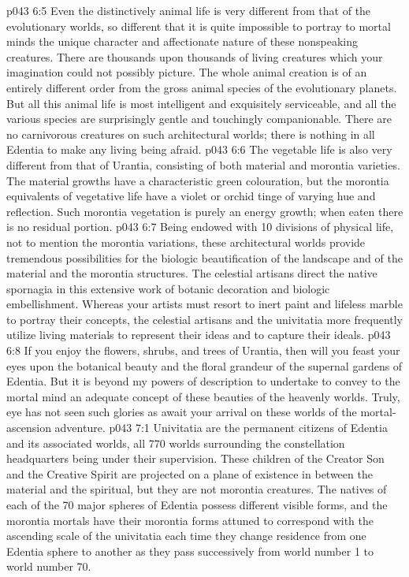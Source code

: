 \vs p043 6:5 Even the distinctively animal life is very different from that of the evolutionary worlds, so different that it is quite impossible to portray to mortal minds the unique character and affectionate nature of these nonspeaking creatures. There are thousands upon thousands of living creatures which your imagination could not possibly picture. The whole animal creation is of an entirely different order from the gross animal species of the evolutionary planets. But all this animal life is most intelligent and exquisitely serviceable, and all the various species are surprisingly gentle and touchingly companionable. There are no carnivorous creatures on such architectural worlds; there is nothing in all Edentia to make any living being afraid.
\vs p043 6:6 The vegetable life is also very different from that of Urantia, consisting of both material and morontia varieties. The material growths have a characteristic green colouration, but the morontia equivalents of vegetative life have a violet or orchid tinge of varying hue and reflection. Such morontia vegetation is purely an energy growth; when eaten there is no residual portion.
\vs p043 6:7 Being endowed with 10 divisions of physical life, not to mention the morontia variations, these architectural worlds provide tremendous possibilities for the biologic beautification of the landscape and of the material and the morontia structures. The celestial artisans direct the native spornagia in this extensive work of botanic decoration and biologic embellishment. Whereas your artists must resort to inert paint and lifeless marble to portray their concepts, the celestial artisans and the univitatia more frequently utilize living materials to represent their ideas and to capture their ideals.
\vs p043 6:8 If you enjoy the flowers, shrubs, and trees of Urantia, then will you feast your eyes upon the botanical beauty and the floral grandeur of the supernal gardens of Edentia. But it is beyond my powers of description to undertake to convey to the mortal mind an adequate concept of these beauties of the heavenly worlds. Truly, eye has not seen such glories as await your arrival on these worlds of the mortal\hyp{}ascension adventure.
\vs p043 7:1 Univitatia are the permanent citizens of Edentia and its associated worlds, all 770 worlds surrounding the constellation headquarters being under their supervision. These children of the Creator Son and the Creative Spirit are projected on a plane of existence in between the material and the spiritual, but they are not morontia creatures. The natives of each of the 70 major spheres of Edentia possess different visible forms, and the morontia mortals have their morontia forms attuned to correspond with the ascending scale of the univitatia each time they change residence from one Edentia sphere to another as they pass successively from world number 1 to world number 70.
